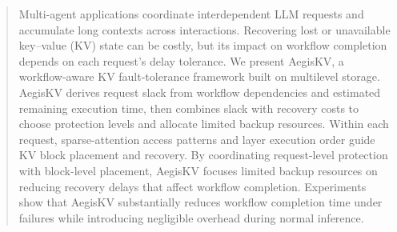 \begin{abstract}
Multi-agent applications coordinate interdependent LLM requests and
accumulate long contexts across interactions. Recovering lost or
unavailable key--value (KV) state can be costly, but its impact on workflow
completion depends on each request's delay tolerance. We present AegisKV,
a workflow-aware KV fault-tolerance framework built on multilevel storage.
AegisKV derives request slack from workflow dependencies and estimated
remaining execution time, then combines slack with recovery costs to
choose protection levels and allocate limited backup resources. Within
each request, sparse-attention access patterns and layer execution order
guide KV block placement and recovery. By coordinating request-level
protection with block-level placement, AegisKV focuses limited backup
resources on reducing recovery delays that affect workflow completion.
Experiments show that AegisKV substantially reduces workflow completion
time under failures while introducing negligible overhead during normal
inference.
\end{abstract}

